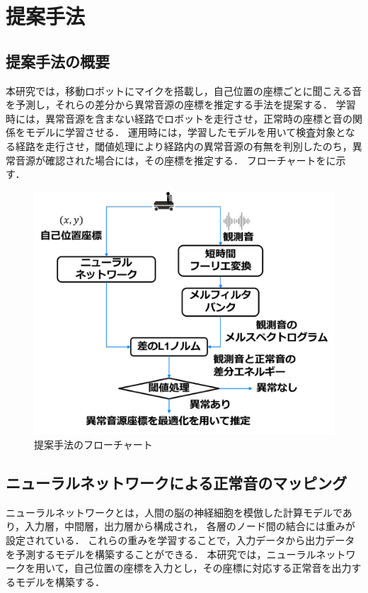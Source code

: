 \documentclass[../main]{subfiles}
\begin{document}
\graphicspath{{../figures/}}

\section{提案手法}





\subsection{提案手法の概要}
本研究では，移動ロボットにマイクを搭載し，自己位置の座標ごとに聞こえる音を予測し，それらの差分から異常音源の座標を推定する手法を提案する．
学習時には，異常音源を含まない経路でロボットを走行させ，正常時の座標と音の関係をモデルに学習させる．
運用時には，学習したモデルを用いて検査対象となる経路を走行させ，閾値処理により経路内の異常音源の有無を判別したのち，異常音源が確認された場合には，その座標を推定する．
フローチャートをに示す．
\begin{figure}[tb]
  \centering
  \includegraphics[keepaspectratio, width=0.8\linewidth]{flowchart.pdf}
  \caption{提案手法のフローチャート}
\end{figure}
\subsection{ニューラルネットワークによる正常音のマッピング}
ニューラルネットワークとは，人間の脳の神経細胞を模倣した計算モデルであり，入力層，中間層，出力層から構成され，
各層のノード間の結合には重みが設定されている．
これらの重みを学習することで，入力データから出力データを予測するモデルを構築することができる．
本研究では，ニューラルネットワークを用いて，自己位置の座標を入力とし，その座標に対応する正常音を出力するモデルを構築する．
\end{document}
